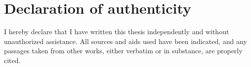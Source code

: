 \section*{Declaration of authenticity}

I hereby declare that I have written this thesis independently and without unauthorized assistance. All sources and aids used have been indicated, and any passages taken from other works, either verbatim or in substance, are properly cited. 
